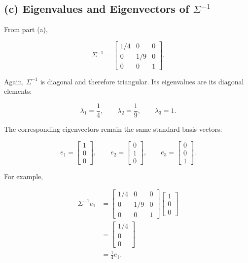 \documentclass[12pt]{article}
\begin{document}
	\subsection*{(c) Eigenvalues and Eigenvectors of $\Sigma^{-1}$}
	
	From part (a),
	
	\[
	\Sigma^{-1}
	=
	\begin{bmatrix}
		1/4&0&0\\
		0&1/9&0\\
		0&0&1
	\end{bmatrix}.
	\]
	
	Again, $\Sigma^{-1}$ is diagonal and therefore triangular.
	Its eigenvalues are its diagonal elements:
	
	\[
	\boxed{
		\lambda_1=\frac14,\qquad
		\lambda_2=\frac19,\qquad
		\lambda_3=1
	}.
	\]
	
	The corresponding eigenvectors remain the same standard basis
	vectors:
	
	\[
	\boxed{
		e_1=
		\begin{bmatrix}
			1\\0\\0
		\end{bmatrix},
		\qquad
		e_2=
		\begin{bmatrix}
			0\\1\\0
		\end{bmatrix},
		\qquad
		e_3=
		\begin{bmatrix}
			0\\0\\1
		\end{bmatrix}
	}.
	\]
	
	For example,
	
	\[
	\begin{aligned}
		\Sigma^{-1}e_1
		&=
		\begin{bmatrix}
			1/4&0&0\\
			0&1/9&0\\
			0&0&1
		\end{bmatrix}
		\begin{bmatrix}
			1\\0\\0
		\end{bmatrix}\\
		&=
		\begin{bmatrix}
			1/4\\0\\0
		\end{bmatrix}\\
		&=
		\frac14e_1.
	\end{aligned}
	\]
	
\end{document}
